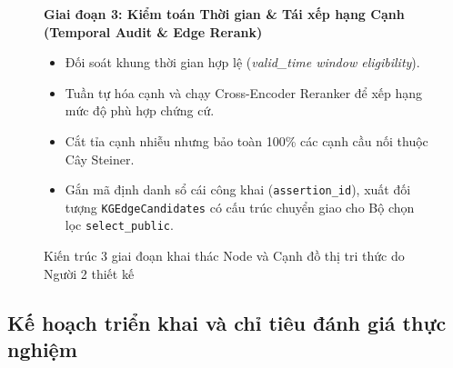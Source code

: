 \documentclass[a4paper,11pt]{article}
\begin{document}
\begin{figure}[htbp]
\begin{tcolorbox}[
    colback=subtlebg, colframe=brandblue, width=\textwidth,
    title={\small\bfseries\color{white} LUỒNG TRUY VẤN ĐỒ THỊ THẾ HỆ MỚI (NEXT-GEN GRAPH RETRIEVAL PIPELINE)},
    fonttitle=\bfseries
]
\vspace{0.15cm}
\textbf{Giai đoạn 3: Kiểm toán Thời gian & Tái xếp hạng Cạnh (Temporal Audit \& Edge Rerank)}
\begin{itemize}[noitemsep,topsep=2pt]
    \item Đối soát khung thời gian hợp lệ (\textit{valid\_time window eligibility}).
    \item Tuần tự hóa cạnh và chạy Cross-Encoder Reranker để xếp hạng mức độ phù hợp chứng cứ.
    \item Cắt tỉa cạnh nhiễu nhưng bảo toàn 100\% các cạnh cầu nối thuộc Cây Steiner.
    \item Gắn mã định danh sổ cái công khai (\texttt{assertion\_id}), xuất đối tượng \texttt{KGEdgeCandidates} có cấu trúc chuyển giao cho Bộ chọn lọc \texttt{select\_public}.
\end{itemize}
\end{tcolorbox}
\caption{Kiến trúc 3 giai đoạn khai thác Node và Cạnh đồ thị tri thức do Người 2 thiết kế}
\label{fig:nextgen-graph-pipeline}
\end{figure}

\subsection{Kế hoạch triển khai và chỉ tiêu đánh giá thực nghiệm}
\label{sec:implementation-roadmap}
\end{document}
